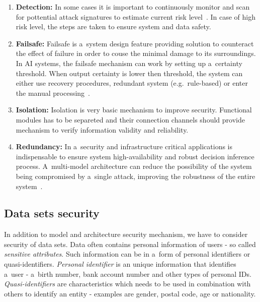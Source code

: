 \begin{enumerate}
    \item \textbf{Detection:} In some cases it is important to continuously monitor and scan for pottential attack signatures to estimate current risk level~\cite{huawei_security}.
    In case of high risk level, the steps are taken to ensure system and data safety.

    \item \textbf{Failsafe:} Failsafe is a~system design feature providing solution to counteract the effect of failure in order to couse the minimal damage to its surroundings.
    In AI systems, the failsafe mechanism can work by setting up a~certainty threshold.
    When output certainty is lower then threshold, the system can either use recovery procedures, redundant system (e.g.\ rule-based) or enter the manual processing~\cite{huawei_security}.

    \item \textbf{Isolation:} Isolation is very basic mechanism to improve security.
    Functional modules has to be separeted and their connection channels should provide mechanism to verify information validity and reliability.

    \item \textbf{Redundancy:} In a~security and infrastructure critical applications is indispensable to ensure system high-availability and robust decision inference process.
    A~multi-model architecture can reduce the possibility of the system being compromised by a~single attack, improving the robustness of the entire system~\cite{huawei_security}.

\end{enumerate}

\subsection{Data sets security}\label{subsec:data-sets-security}

In addition to model and architecture security mechanism, we have to consider security of data sets.
Data often contains personal information of users - so called \textit{sensitive attributes}.
Such information can be in a~form of personal identifiers or quasi-identifiers.
\textit{Personal identifier} is an unique information that identifies a~user - a~birth number, bank account number and other types of personal IDs.
\textit{Quasi-identifiers} are characteristics which needs to be used in combination with others to identify an entity - examples are gender, postal code, age or nationality.


